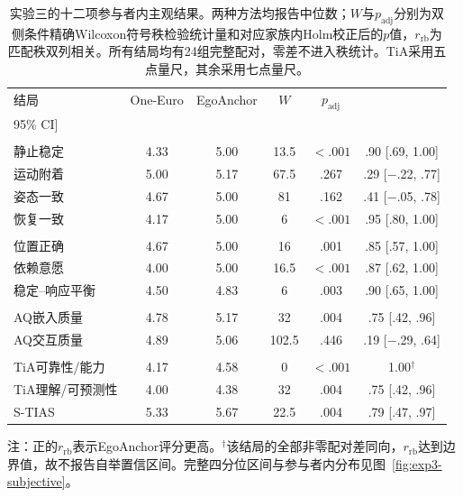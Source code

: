 \begin{table}[t]
\centering
\caption{实验三的十二项参与者内主观结果。两种方法均报告中位数；$W$与$p_{\mathrm{adj}}$分别为双侧条件精确Wilcoxon符号秩检验统计量和对应家族内Holm校正后的$p$值，$r_{\mathrm{rb}}$为匹配秩双列相关。所有结局均有24组完整配对，零差不进入秩统计。TiA采用五点量尺，其余采用七点量尺。}
\label{tab:exp3-subjective}
\setlength{\tabcolsep}{1.8pt}
\renewcommand{\arraystretch}{1.08}
\begin{tabularx}{\columnwidth}{@{}>{\raggedright\arraybackslash}Xccccc@{}}
\toprule
结局 & One-Euro & EgoAnchor & $W$ & $p_{\mathrm{adj}}$ & \shortstack{$r_{\mathrm{rb}}$\\{[}95\% CI{]}} \\
\midrule
\multicolumn{6}{@{}l}{\textit{阶段锚点行为}} \\
静止稳定 & 4.33 & 5.00 & 13.5 & $<.001$ & .90 [.69, 1.00] \\
运动附着 & 5.00 & 5.17 & 67.5 & .267 & .29 [$-$.22, .77] \\
姿态一致 & 4.67 & 5.00 & 81 & .162 & .41 [$-$.05, .78] \\
恢复一致 & 4.17 & 5.00 & 6 & $<.001$ & .95 [.80, 1.00] \\
\addlinespace[2pt]
\multicolumn{6}{@{}l}{\textit{整体锚定判断}} \\
位置正确 & 4.67 & 5.00 & 16 & .001 & .85 [.57, 1.00] \\
依赖意愿 & 4.00 & 5.00 & 16.5 & $<.001$ & .87 [.62, 1.00] \\
稳定--响应平衡 & 4.50 & 4.83 & 6 & .003 & .90 [.65, 1.00] \\
\addlinespace[2pt]
\multicolumn{6}{@{}l}{\textit{增强质量}} \\
AQ嵌入质量 & 4.78 & 5.17 & 32 & .004 & .75 [.42, .96] \\
AQ交互质量 & 4.89 & 5.06 & 102.5 & .446 & .19 [$-$.29, .64] \\
\addlinespace[2pt]
\multicolumn{6}{@{}l}{\textit{信任}} \\
TiA可靠性/能力 & 4.17 & 4.58 & 0 & $<.001$ & 1.00$^{\dagger}$ \\
TiA理解/可预测性 & 4.00 & 4.38 & 32 & .004 & .75 [.42, .96] \\
S-TIAS & 5.33 & 5.67 & 22.5 & .004 & .79 [.47, .97] \\
\bottomrule
\end{tabularx}
\vspace{2pt}
\parbox{\columnwidth}{\scriptsize 注：正的$r_{\mathrm{rb}}$表示EgoAnchor评分更高。$^{\dagger}$该结局的全部非零配对差同向，$r_{\mathrm{rb}}$达到边界值，故不报告自举置信区间。完整四分位区间与参与者内分布见图~\ref{fig:exp3-subjective}。}
\end{table}
